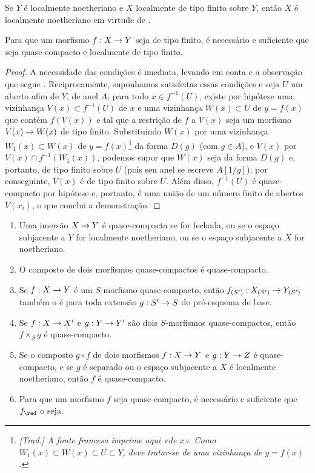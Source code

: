 \documentclass[oneside]{amsart}
\makeatletter
\newcommand{\ega@arrow}[2]{\mathchoice{#1}{#2}{#2}{#2}}
\renewcommand{\to}{\ega@arrow{\longrightarrow}{\rightarrow}}
\let\EGAOriginalLabel\label
\renewcommand{\label}[1]{\phantomsection\EGAOriginalLabel{#1}}
\makeatother
\begin{document}
Se $Y$ é localmente noetheriano e $X$ localmente de tipo finito sobre $Y$, então $X$ é localmente noetheriano em virtude de .

\begin{proposition}[6.6.3]
\label{I.6.6.3}
Para que um morfismo $f: X\to Y$ seja de tipo finito, é necessário e suficiente que seja quase-compacto e localmente de tipo finito.
\end{proposition}

\begin{proof}
A necessidade das condições é imediata, levando em conta  e a observação que segue .
Reciprocamente, suponhamos satisfeitas essas condições e seja $U$ um aberto afim de $Y$, de anel $A$;
para todo $x\in f^{-1}(U)$, existe por hipótese uma vizinhança $V(x)\subset f^{-1}(U)$ de $x$ e uma vizinhança $W(x)\subset U$ de $y=f(x)$ que contém $f(V(x))$ e tal que a restrição de $f$ a $V(x)$ seja um morfismo $V(x)\to W(x)$ de tipo finito.
Substituindo $W(x)$ por uma vizinhança $W_1(x)\subset W(x)$ de $y=f(x)$\footnote{\emph{[Trad.] A fonte francesa imprime aqui «de $x$». Como $W_1(x)\subset W(x)\subset U\subset Y$, deve tratar-se de uma vizinhança de $y=f(x)$.}} da forma $D(g)$ (com $g\in A$), e $V(x)$ por $V(x)\cap f^{-1}(W_1(x))$, podemos supor que $W(x)$ seja da forma $D(g)$ e, portanto, de tipo finito sobre $U$ (pois seu anel se escreve $A[1/g]$);
por conseguinte, $V(x)$ é de tipo finito sobre $U$.
Além disso, $f^{-1}(U)$ é quase-compacto por hipótese e, portanto, é uma união de um número finito de abertos $V(x_i)$, o que conclui a demonstração.
\end{proof}

\begin{proposition}[6.6.4]
\label{I.6.6.4}
\medskip\noindent
\begin{enumerate}
  \item[{\rm(i)}] Uma imersão $X\to Y$ é quase-compacta se for fechada, ou se o espaço subjacente a $Y$ for localmente noetheriano, ou se o espaço subjacente a $X$ for noetheriano.
  \item[{\rm(ii)}] O composto de dois morfismos quase-compactos é quase-compacto.
  \item[{\rm(iii)}] Se $f: X\to Y$ é um $S$-morfismo quase-compacto, então $f_{(S')}: X_{(S')}\to Y_{(S')}$ também o é para toda extensão $g: S'\to S$ do pré-esquema de base.
  \item[{\rm(iv)}] Se $f:X\to X'$ e $g:Y\to Y'$ são dois $S$-morfismos quase-compactos, então $f\times_S g$ é quase-compacto.
  \item[{\rm(v)}] Se o composto $g\circ f$ de dois morfismos $f: X\to Y$ e $g:Y\to Z$ é quase-compacto, e se $g$ é separado ou o espaço subjacente a $X$ é localmente noetheriano, então $f$ é quase-compacto.
  \item[{\rm(vi)}] Para que um morfismo $f$ seja quase-compacto, é necessário e suficiente que $f_\red$ o seja.
\end{enumerate}
\end{proposition}
\end{document}
